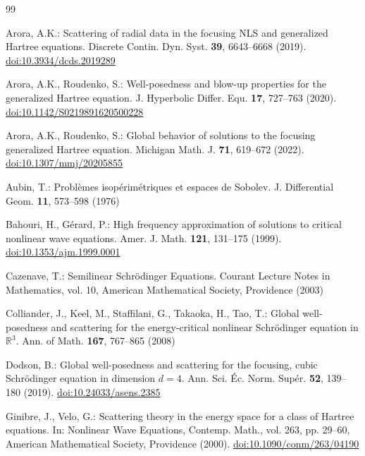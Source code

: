 \documentclass[preprint,12pt]{elsarticle}
\numberwithin{equation}{section}
\theoremstyle{remark}
\newcommand{\R}{\mathbb R}
\begin{document}
\begin{thebibliography}{99}

Arora, A.K.:
Scattering of radial data in the focusing NLS and generalized Hartree equations.
Discrete Contin. Dyn. Syst. \textbf{39}, 6643--6668 (2019).
\href{https://doi.org/10.3934/dcds.2019289}{doi:10.3934/dcds.2019289}

Arora, A.K., Roudenko, S.:
Well-posedness and blow-up properties for the generalized Hartree equation.
J. Hyperbolic Differ. Equ. \textbf{17}, 727--763 (2020).
\href{https://doi.org/10.1142/S0219891620500228}{doi:10.1142/S0219891620500228}

Arora, A.K., Roudenko, S.:
Global behavior of solutions to the focusing generalized Hartree equation.
Michigan Math. J. \textbf{71}, 619--672 (2022).
\href{https://doi.org/10.1307/mmj/20205855}{doi:10.1307/mmj/20205855}

Aubin, T.:
Probl\`emes isop\'erim\'etriques et espaces de Sobolev.
J. Differential Geom. \textbf{11}, 573--598 (1976)

Bahouri, H., G\'erard, P.:
High frequency approximation of solutions to critical nonlinear wave equations.
Amer. J. Math. \textbf{121}, 131--175 (1999).
\href{https://doi.org/10.1353/ajm.1999.0001}{doi:10.1353/ajm.1999.0001}

Cazenave, T.:
Semilinear Schr\"odinger Equations.
Courant Lecture Notes in Mathematics, vol. 10, American Mathematical Society, Providence (2003)

Colliander, J., Keel, M., Staffilani, G., Takaoka, H., Tao, T.:
Global well-posedness and scattering for the energy-critical nonlinear Schr\"odinger equation in $\R^3$.
Ann. of Math. \textbf{167}, 767--865 (2008)

Dodson, B.:
Global well-posedness and scattering for the focusing, cubic Schr\"odinger equation in dimension $d=4$.
Ann. Sci. \'Ec. Norm. Sup\'er. \textbf{52}, 139--180 (2019).
\href{https://doi.org/10.24033/asens.2385}{doi:10.24033/asens.2385}

Ginibre, J., Velo, G.:
Scattering theory in the energy space for a class of Hartree equations.
In: Nonlinear Wave Equations, Contemp. Math., vol. 263, pp. 29--60,
American Mathematical Society, Providence (2000).
\href{https://doi.org/10.1090/conm/263/04190}{doi:10.1090/conm/263/04190}


\end{thebibliography}
\end{document}
